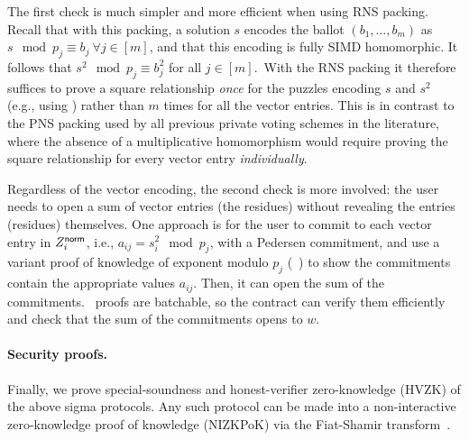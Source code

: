 The first check is much simpler and more efficient when using RNS packing. Recall that with this packing, a solution $s$ encodes the ballot $(b_1, \dots, b_m)$ as $s \mod{p_j} \equiv b_j\ \forall j \in [m]$, and that this encoding is fully SIMD homomorphic. It follows that $s^2 \mod{p_j} \equiv b_j^2$ for all $j \in [m]$.\footnotemark\ With the RNS packing it therefore suffices to prove a square relationship \emph{once} for the puzzles encoding $s$ and $s^2$ (e.g., using \zkposqs) rather than $m$ times for all the vector entries. This is in contrast to the PNS packing used by all previous private voting schemes in the literature, where the absence of a multiplicative homomorphism would require proving the square relationship for every vector entry \emph{individually}.

Regardless of the vector encoding, the second check is more involved: the user needs to open a sum of vector entries (the residues) without revealing the entries (residues) themselves. One approach is for the user to commit to each vector entry in $Z_i^{\sf norm}$, i.e., $a_{ij} = s_i^2 \mod p_j$, with a Pedersen commitment, and use a variant proof of knowledge of exponent modulo $p_j$ (\pokemon~\cite{C:BonBunFis19}) to show the commitments contain the appropriate values $a_{ij}$. Then, it can open the sum of the commitments. \pokemon\ proofs are batchable, so the contract can verify them efficiently and check that the sum of the commitments opens to $w$.


\paragraph{Security proofs.}
Finally, we prove special-soundness and honest-verifier zero-knowledge (HVZK) of the above sigma protocols. Any such protocol can be made into a non-interactive zero-knowledge proof of knowledge (NIZKPoK) via the Fiat-Shamir transform~\cite{C:FiaSha86}.

